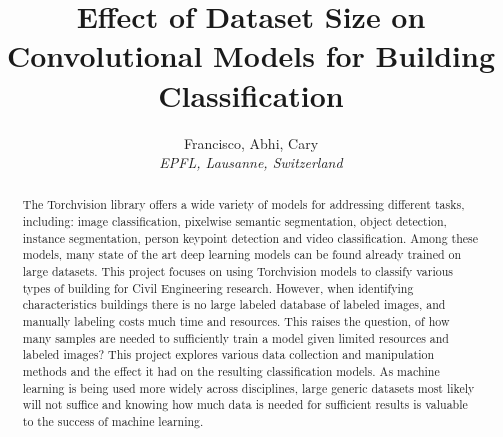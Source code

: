 \documentclass[10pt,conference,compsocconf]{IEEEtran}
\begin{document}
\title{Effect of Dataset Size on Convolutional Models for Building Classification}

\author{
  Francisco, Abhi, Cary\\
  \textit{EPFL, Lausanne, Switzerland}
}

\maketitle

\begin{abstract}
 The Torchvision library offers a wide variety of models for addressing different tasks, including: image classification, pixelwise semantic segmentation, object detection, instance segmentation, person keypoint detection and video classification. Among these models, many state of the art deep learning models can be found already trained on large datasets. This project focuses on using Torchvision models to classify various types of building  for Civil Engineering research. However, when identifying characteristics buildings there is no large labeled database of labeled images, and manually labeling costs much time and resources. This raises the question, of how many samples are needed to sufficiently train a model given limited resources and labeled images? This project explores various data collection and manipulation methods and the effect it had on the resulting classification models. As machine learning is being used more widely across disciplines, large generic datasets most likely will not suffice and knowing how much data is needed for sufficient results is valuable to the success of machine learning.
\end{abstract}
\end{document}
